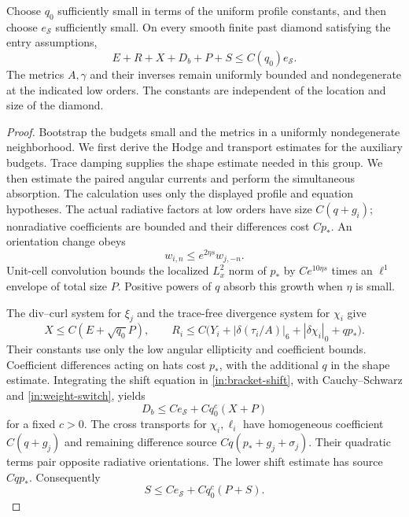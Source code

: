 \begin{proposition}
\label{in:low}
Choose $q_0$ sufficiently small in terms of the uniform profile
constants, and then choose $e_{\mathcal S}$ sufficiently small.
On every smooth finite past diamond satisfying the entry assumptions,
\begin{equation}\label{in:low-conclusion}
 E+R+X+D_b+P+S\le C(q_0)e_{\mathcal S}.
\end{equation}
The metrics $A,\gamma$ and their inverses remain uniformly bounded
and nondegenerate at the indicated low orders. The constants are
independent of the location and size of the diamond.
\end{proposition}

\begin{proof}
Bootstrap the budgets small and the metrics in a uniformly
nondegenerate neighborhood. We first derive the Hodge and transport
estimates for the auxiliary budgets. Trace damping supplies the
shape estimate needed in this group. We then estimate the paired
angular currents and perform the simultaneous absorption.
The calculation uses only the displayed profile and equation
hypotheses. The actual radiative factors at low orders have
size $C(q+g_i)$; nonradiative coefficients are bounded and their
differences cost $Cp_*$. An orientation change obeys
\begin{equation}\label{in:weight-switch}
 w_{i,n}\le e^{2\eta s}w_{j,-n}.
\end{equation}
Unit-cell convolution bounds the localized $L^2_x$ norm of $p_*$ by
$Ce^{10\eta s}$ times an $\ell^1$ envelope of total size $P$.
Positive powers of $q$ absorb this growth when $\eta$ is small.

The div--curl system for $\xi_j$ and the trace-free divergence
system for $\chi_i$ give
\begin{equation}\label{in:low-hodge}
 X\le C(E+\sqrt{q_0}P),\qquad
 R_i\le C\bigl(Y_i+|\delta(\tau_i/A)|_6
                         +|\delta\chi_i|_0+qp_*\bigr).
\end{equation}
Their constants use only the low angular ellipticity and coefficient
bounds. Coefficient differences acting on hats cost $p_*$, with the
additional $q$ in the shape estimate. Integrating the shift equation
in \eqref{in:bracket-shift}, with Cauchy--Schwarz and
\eqref{in:weight-switch}, yields
\begin{equation}\label{in:low-shift}
 D_b\le Ce_{\mathcal S}+Cq_0^c(X+P)
\end{equation}
for a fixed $c>0$. The cross transports for $\chi_i,\ell_i$ have
homogeneous coefficient $C(q+g_j)$ and remaining difference source
$Cq(p_*+g_j+\sigma_j)$. Their quadratic terms pair opposite
radiative orientations. The lower shift estimate has source $Cqp_*$.
Consequently
\begin{equation}\label{in:low-characteristic}
 S\le Ce_{\mathcal S}+Cq_0^c(P+S).
\end{equation}


\end{proof}
